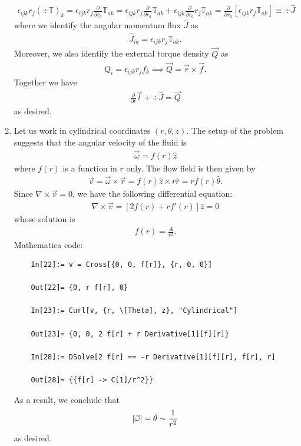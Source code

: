 \documentclass{article}
\theoremstyle{definition}
\newcommand{\p}{\partial}
\newcommand{\f}[2]{\frac{#1}{#2}}
\newcommand{\lb}{\left[}
\newcommand{\rb}{\right]}
\begin{document}
\begin{enumerate}[label=(\alph*)]
	\begin{align*}
	\epsilon_{ijk} r_j (\div \mathbb{T})_k = \epsilon_{ijk} r_j \f{\p}{\p r_a} \mathbb{T}_{ak} = \epsilon_{ijk} r_j \f{\p}{\p r_a}  \mathbb{T}_{ak} + \epsilon_{ijk} \f{\p}{\p r_a}  r_j  \mathbb{T}_{ak} = \f{\p}{\p r_a} \lb \epsilon_{ijk} r_j \mathbb{T}_{ak} \rb \equiv \div \hat{J}
	\end{align*}
	where we identify the angular momentum flux $\hat J$ as
	\begin{align*}
	\hat{J}_{ia} = \epsilon_{ijk} r_j \mathbb{T}_{ak}. 
	\end{align*}
	Moreover, we also identify the external torque density $\vec{Q}$ as 
	\begin{align*}
	Q_i = \epsilon_{ijk} r_j f_k \implies \vec{Q} = \vec{r} \times \vec{f}.
	\end{align*}
	Together we have
	\begin{align*}
	\f{\p}{\p t}\vec{l} + \div \hat J = \vec{Q}
	\end{align*}
	as desired. 
	
	\item Let us work in cylindrical coordinates $(r,\theta,z)$. The setup of the problem suggests that the angular velocity of the fluid is 
	\begin{align*}
	\vec{\omega} = f(r) \hat z
	\end{align*}
	where $f(r)$ is a function in $r$ only. The flow field is then given by 
	\begin{align*}
	\vec{v} = \vec{\omega}\times \vec{r} = f(r)\hat{z} \times r\hat{r} = rf(r) \hat\theta.
	\end{align*}
	Since $\nabla \times \vec{v} = 0$, we have the following differential equation:
	\begin{align*}
	\nabla \times \vec{v} = [2 f(r) + rf'(r)] \hat{z} = 0
	\end{align*}
	whose solution is 
	\begin{align*}
	f(r) = \f{A}{r^2}.
	\end{align*}
	Mathematica code:
	\begin{lstlisting}
	In[22]:= v = Cross[{0, 0, f[r]}, {r, 0, 0}]
	
	Out[22]= {0, r f[r], 0}
	
	In[23]:= Curl[v, {r, \[Theta], z}, "Cylindrical"]
	
	Out[23]= {0, 0, 2 f[r] + r Derivative[1][f][r]}
	
	In[28]:= DSolve[2 f[r] == -r Derivative[1][f][r], f[r], r]
	
	Out[28]= {{f[r] -> C[1]/r^2}}
	\end{lstlisting}
	As a result, we conclude that
	\begin{align*}
	\abs{\vec{\omega}} = \dot\theta \sim \f{1}{r^2} 
	\end{align*}
	as desired. \\
	

\end{enumerate}
\end{document}
